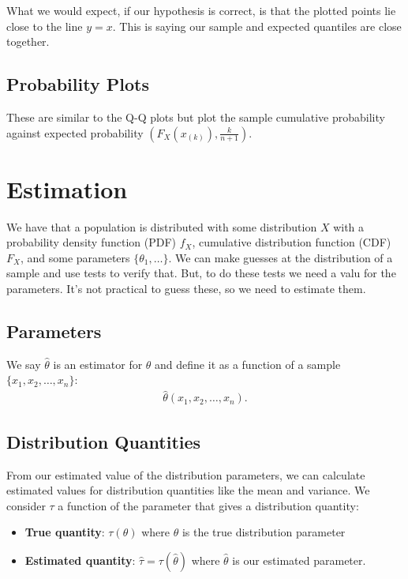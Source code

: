 \documentclass[a4paper, 12pt, twoside]{article}
\begin{document}
What we would expect, if our hypothesis is correct, is that the
plotted points lie close to the line $y = x$. This is saying our
sample and expected quantiles are close together.

\subsection{Probability Plots}

These are similar to the Q-Q plots but plot the sample cumulative
probability against expected probability $(F_X(x_{(k)}), \frac{k}{n + 1})$.


\section{Estimation}

We have that a population is distributed with some distribution $X$
with a probability density function (PDF) $f_X$, cumulative
distribution function (CDF) $F_X$, and some parameters
$\{\theta_1, \ldots\}$. We can make guesses at the distribution of a sample and use tests to
verify that. But, to do these tests we need a valu for the parameters.
It's not practical to guess these, so we need to estimate them.

\subsection{Parameters}

We say $\hat{\theta}$ is an estimator for $\theta$ and define it as
a function of a sample $\{x_1, x_2, \ldots, x_n\}$:
\begin{align*}
    \hat{\theta}(x_1, x_2, \ldots, x_n).
\end{align*}

\subsection{Distribution Quantities}

From our estimated value of the distribution parameters, we can
calculate estimated values for distribution quantities like the
mean and variance. We consider $\tau$ a function of the parameter
that gives a distribution quantity:

\begin{itemize}
    \item \textbf{True quantity}: $\tau(\theta)$ where $\theta$
          is the true distribution parameter
    \item \textbf{Estimated quantity}:
          $\hat{\tau} = \tau(\hat{\theta})$ where $\hat{\theta}$ is our
          estimated parameter.
\end{itemize}
\end{document}
